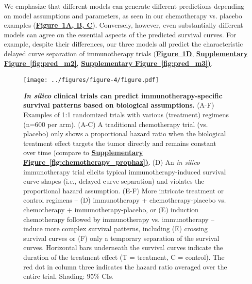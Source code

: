 \documentclass[a4paper,10pt]{article}
\newcommand{\myref}[2]{\hyperref[#1]{\bfseries Figure~\ref*{#1}#2}}
\newcommand{\mysupp}[2]{\hyperref[#1]{\bfseries Supplementary Figure~\ref*{#1}#2}}
\newcommand{\newbit}{\color{red!70!black}}
\begin{document}
{\newbit {} We emphasize that different models can generate different predictions depending 
on model assumptions and parameters, as seen in our chemotherapy vs. placebo examples
(\myref{fig:fig3}{A, B, C}). Conversely, however, even substantially different models
can agree on the essential aspects of the predicted survival curves. For example, despite
 their differences, our three models all predict the characteristic delayed curve separation
of immunotherapy trials (\myref{fig:fig3}{D}, \mysupp{fig:pred_m2}, \mysupp{fig:pred_m3}).
} 

\begin{figure}

\centering

\texttt{[image: ../figures/figure-4/figure.pdf]}

\internallinenumbers
\caption{
{\bfseries \emph{In silico} clinical trials can predict immunotherapy-specific survival patterns based on biological assumptions.}
(A-F) Examples of 1:1 randomized trials with various (treatment) regimens (n=600 per arm). (A-C) A traditional chemotherapy
trial (vs. placebo) only shows a proportional hazard ratio when the biological treatment effect targets the tumor directly and
remains constant over time (compare to \mysupp{fig:chemotherapy_prophaz}). (D) An 
\emph{in silico} immunotherapy trial elicits typical immunotherapy-induced survival curve shapes 
(i.e., delayed curve separation) and violates the proportional hazard assumption.
(E-F) More intricate treatment or control regimens -- (D) immunotherapy +
chemotherapy-placebo vs. chemotherapy + immunotherapy-placebo, or (E) induction chemotherapy followed by
immunotherapy vs. immunotherapy -- induce more complex survival patterns, including (E) crossing 
survival curves or (F) only
a temporary separation of the survival curves. Horizontal bars underneath the survival curves 
indicate the duration of the treatment effect (T = treatment, C = control). The red dot in column 
three indicates the hazard ratio averaged over the entire trial. Shading: 95\% CIs.
}
	\label{fig:fig3}
\end{figure}
\end{document}
